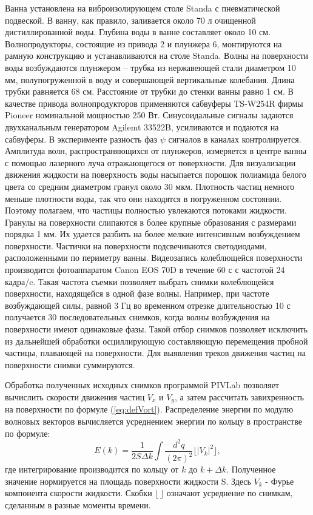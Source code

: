 Ванна установлена на виброизолирующем столе Standa с пневматической подвеской. В ванну, как правило, заливается около 70 л очищенной дистиллированной воды. Глубина воды в ванне составляет около 10 см. Волнопродукторы, состоящие из привода 2 и плунжера 6, монтируются на рамную конструкцию и устанавливаются на столе Standa. Волны на поверхности воды возбуждаются плунжером – трубка из нержавеющей стали диаметром 10 мм, полупогруженной в воду и совершающей вертикальные колебания. Длина трубки равняется 68 см. Расстояние от трубки до стенки ванны равно 1 см. В качестве привода волнопродукторов применяются сабвуферы TS-W254R фирмы Pioneer номинальной мощностью 250 Вт. Синусоидальные сигналы задаются двухканальным генератором Agilemt 33522B, усиливаются и подаются на сабвуферы. В эксперименте разность фаз $\psi$ сигналов в каналах контролируется. Амплитуда волн, распространяющихся от плунжеров, измеряется в центре ванны с помощью лазерного луча отражающегося от поверхности. Для визуализации движения жидкости на поверхность воды насыпается порошок полиамида белого цвета со средним диаметром гранул около 30 мкм. Плотность частиц немного меньше плотности воды, так что они находятся в погруженном состоянии. Поэтому полагаем, что частицы полностью увлекаются потоками жидкости. Гранулы на поверхности слипаются в более крупные образования с размерами порядка 1 мм. Их удается разбить на более мелкие интенсивным возбуждением поверхности. Частички на поверхности подсвечиваются светодиодами, расположенными по периметру ванны. Видеозапись колеблющейся поверхности производится фотоаппаратом Canon EOS 70D в течение 60 с с частотой 24 кадра/c. Такая частота съемки позволяет выбрать снимки колеблющейся поверхности, находящейся в одной фазе волны. Например, при частоте возбуждающей силы, равной 3 Гц во временном отрезке длительностью 10 с получается 30 последовательных снимков, когда волны возбуждения на поверхности имеют одинаковые фазы. Такой отбор снимков позволяет исключить из дальнейшей обработки осциллирующую составляющую перемещения пробной частицы, плавающей на поверхности. Для выявления треков движения частиц на поверхности снимки суммируются.

Обработка полученных исходных снимков программой PIVLab \cite{piv} позволяет вычислить скорости движения частиц $V_x$ и $V_y$, а затем рассчитать завихренность на поверхности по формуле (\ref{eq:defVort}). Распределение энергии по модулю волновых векторов вычисляется усреднением энергии по кольцу в пространстве по формуле:
\begin{equation}
E(k) = \frac{1}{ 2 S \Delta k}\int \frac{d^2 q}{(2 \pi)^2} \lfloor |V_k|^2 \rfloor,
\end{equation}
где интегрирование производится по кольцу от ${k}$ до ${k} + \Delta{k}$. Полученное значение нормируется на площадь поверхности жидкости S. Здесь $V_k$ - Фурье компонента скорости жидкости. Скобки $\lfloor \, \rfloor$ означают усреднение по снимкам, сделанным в разные моменты времени.
	
